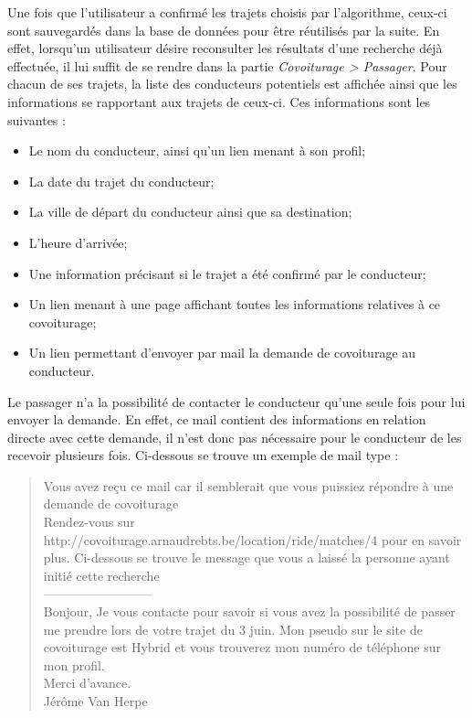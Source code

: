 \documentclass[12pt, a4paper, oneside]{article}
\begin{document}
     \indent Une fois que l'utilisateur a confirmé les trajets choisis par l'algorithme, ceux-ci sont sauvegardés dans la base de données pour être réutilisés par la suite. En effet, lorsqu'un utilisateur désire reconsulter les résultats d'une recherche déjà effectuée, il lui suffit de se rendre dans la partie \textit{Covoiturage > Passager}. Pour chacun de ses trajets, la liste des conducteurs potentiels est affichée ainsi que les informations se rapportant aux trajets de ceux-ci. Ces informations sont les suivantes :
     \begin{itemize}
        \item Le nom du conducteur, ainsi qu'un lien menant à son profil;
        \item La date du trajet du conducteur;
        \item La ville de départ du conducteur ainsi que sa destination;
        \item L'heure d'arrivée;
        \item Une information précisant si le trajet a été confirmé par le conducteur;
        \item Un lien menant à une page affichant toutes les informations relatives à ce covoiturage;
        \item Un lien permettant d'envoyer par mail la demande de covoiturage au conducteur.\\
     \end{itemize}
     Le passager n'a la possibilité de contacter le conducteur qu'une seule fois pour lui envoyer la demande. En effet, ce mail contient des informations en relation directe avec cette demande, il n'est donc pas nécessaire pour le conducteur de les recevoir plusieurs fois. Ci-dessous se trouve un exemple de mail type :
     \begin{quote}\label{mail-exemple}
         Vous avez reçu ce mail car il semblerait que vous puissiez répondre à une demande de covoiturage\\
         Rendez-vous sur http://covoiturage.arnaudrebts.be/location/ride/matches/4 pour en savoir plus.
          Ci-dessous se trouve le message que vous a laissé la personne ayant initié cette recherche\\
          --------------------------\\
            Bonjour,
            Je vous contacte pour savoir si vous avez la possibilité de passer me prendre lors de votre trajet du 3 juin.
            Mon pseudo sur le site de covoiturage est Hybrid et vous trouverez mon numéro de téléphone sur mon profil.\\
            
            Merci d'avance.\\
            Jérôme Van Herpe
        \end{quote}
\end{document}
